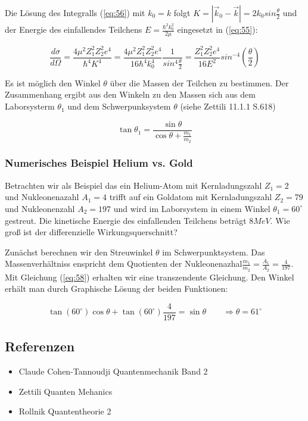 Die Lösung des Integralls (\ref{eq:56}) mit \(k_0=k\) folgt \(K = |\vec k_0-\vec k| = 2k_0 sin\frac{\theta}{2} \) und  der Energie des einfallendes Teilchens \(E=\frac{\hbar^2k_0^2}{2\mu}\)  eingesetzt in (\ref{eq:55}):

\begin{equation}
  \label{eq:57}
  \frac{d\sigma}{d\Omega}=  \frac{4\mu^2Z_1^2Z_2^2e^4}{\hbar^4 K^4} = \frac{4\mu^2Z_1^2Z_2^2e^4}{16 \hbar^4 k_0^4}\frac{1}{sin^4\frac{\theta}{2} } = \frac{Z_1^2Z_2^2e^4}{16 E^2}sin^{-4}(\frac{\theta}{2})
\end{equation}


Es ist möglich den Winkel \(\theta\) über die Massen der Teilchen zu bestimmen. Der Zusammenhang ergibt aus den Winkeln  zu den Massen sich aus dem Laborsysterm \(\theta_1\) und dem Schwerpunksystem \(\theta\) (siehe Zettili 11.1.1 S.618)

\begin{equation}
  \label{eq:58}
  \tan\theta_1=\frac{\sin\theta}{\cos\theta+\frac{m_1}{m_2}}
\end{equation}

\subsubsection{Numerisches Beispiel Helium vs. Gold}

Betrachten wir als Beispiel das ein Helium-Atom mit Kernladungszahl \(Z_1=2\) und Nukleonenazahl \(A_1 = 4\) trifft auf ein Goldatom mit Kernladungszahl \(Z_2=79\) und Nukleonenzahl \(A_2 = 197\) und wird im Laborsystem in einem Winkel  \(\theta_1=60^\circ\) gestreut. Die kinetische Energie des einfallenden Teilchens beträgt \(8MeV\). Wie groß ist der differenzielle Wirkungsquerschnitt?

Zunächst berechnen wir den Streuwinkel \(\theta\) im Schwerpunktsystem. Das Massenverhältniss enspricht dem Quotienten der Nukleonenazhal\(\frac{m_1}{m_2}=\frac{A_1}{A_2}=\frac{4}{197} \). Mit Gleichung (\ref{eq:58}) erhalten wir eine transzendente Gleichung. Den Winkel erhält man durch Graphische Lösung der beiden Funktionen:

\begin{equation}
  \label{eq:59}
  \tan(60^\circ)\cos\theta+ \tan(60^\circ)\frac{4}{197}  = \sin\theta \qquad\Rightarrow \theta=61^\circ
\end{equation}












\subsection*{Referenzen}
\begin{itemize}
\item Claude Cohen-Tannoudji Quantenmechanik Band 2
\item Zettili Quanten Mehanics
\item Rollnik Quantentheorie 2
\end{itemize}


